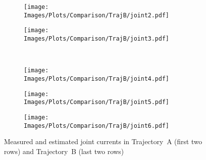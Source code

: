 \begin{figure*}
    \hfill
    \begin{subfigure}[b]{\figsize}
        \centering
        \texttt{[image: Images/Plots/Comparison/TrajB/joint2.pdf]}
    \end{subfigure}
    \hfill
    \begin{subfigure}[b]{\figsize}
        \centering
        \texttt{[image: Images/Plots/Comparison/TrajB/joint3.pdf]}
    \end{subfigure}
    \\ \vspace{0.25em}
    \begin{subfigure}[b]{\figsize}
        \centering
        \texttt{[image: Images/Plots/Comparison/TrajB/joint4.pdf]}
    \end{subfigure}
    \hfill
    \begin{subfigure}[b]{\figsize}
        \centering
        \texttt{[image: Images/Plots/Comparison/TrajB/joint5.pdf]}
    \end{subfigure}
    \hfill
    \begin{subfigure}[b]{\figsize}
        \centering
        \texttt{[image: Images/Plots/Comparison/TrajB/joint6.pdf]}
    \end{subfigure}    

    \caption{Measured and estimated joint currents in Trajectory~A (first two rows) and Trajectory~B (last two rows)}
    \label{fig:comparison}
\end{figure*}
